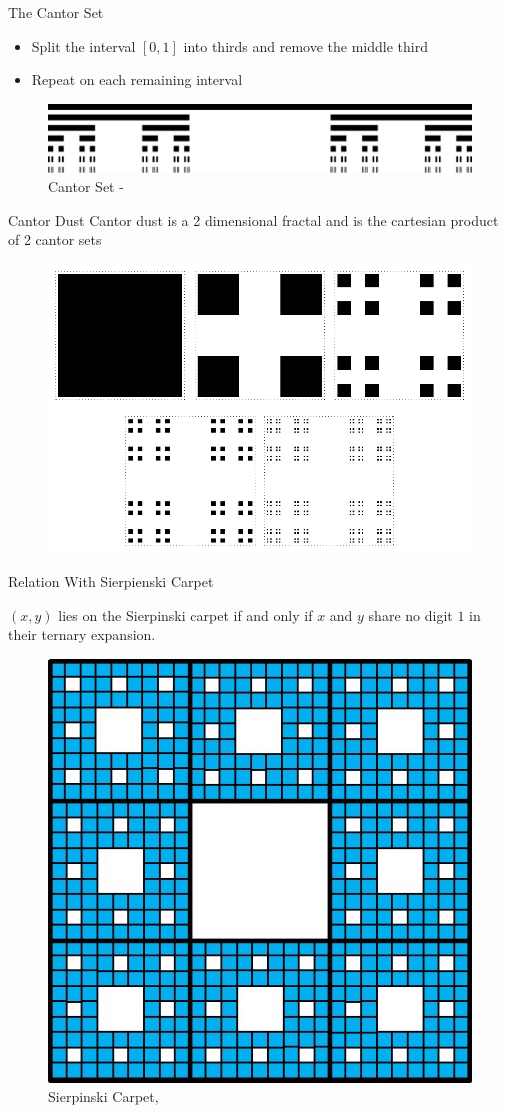 \begin{frame}[c]{The Cantor Set}
\begin{itemize}
    \item Split the interval $[0,1]$ into thirds and remove the middle third
    \item Repeat on each remaining interval
\end{itemize}
\begin{figure}
    \centering
    \includegraphics[width=0.7\linewidth]{Cantor_set_in_seven_iterations.svg.png}
    \caption{Cantor Set - \cite{cantor}}
    \label{fig:enter-label}
\end{figure}
\end{frame}

\begin{frame}{Cantor Dust}
Cantor dust is a 2 dimensional fractal and is the cartesian product of 2 cantor sets
 \begin{figure}
     \centering
     \includegraphics[width=0.5\linewidth]{cantordust.png}
     \caption{\cite{Dickau_Cantor_Dust}}
     \label{fig:enter-label}
 \end{figure}
\end{frame}

\begin{frame}{Relation With Sierpienski Carpet}
 \begin{lemma}
     $(x,y)$ lies on the Sierpinski carpet if and only if $x$ and $y$ share no digit $1$ in their ternary expansion.
 \end{lemma}
\begin{figure}
    \centering
    \includegraphics[width=0.2\linewidth]{Carpet.jpg}
    \caption{Sierpinski Carpet, \cite{sierpinski2016}}
    \label{fig:enter-label}
\end{figure}
\end{frame}

